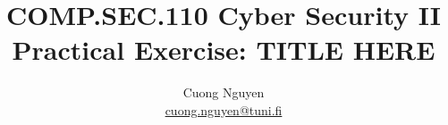 \documentclass{article}
\title{COMP.SEC.110 Cyber Security II
    \large Practical Exercise: TITLE HERE\!
}
\author{Cuong Nguyen\\ \href{mailto:cuong.nguyen@tuni.fi}{cuong.nguyen@tuni.fi}}
\begin{document}
    
\maketitle
\tableofcontents
\newpage

\listoffigures
\newpage

% 
% 





\printbibliography{}
\end{document}
